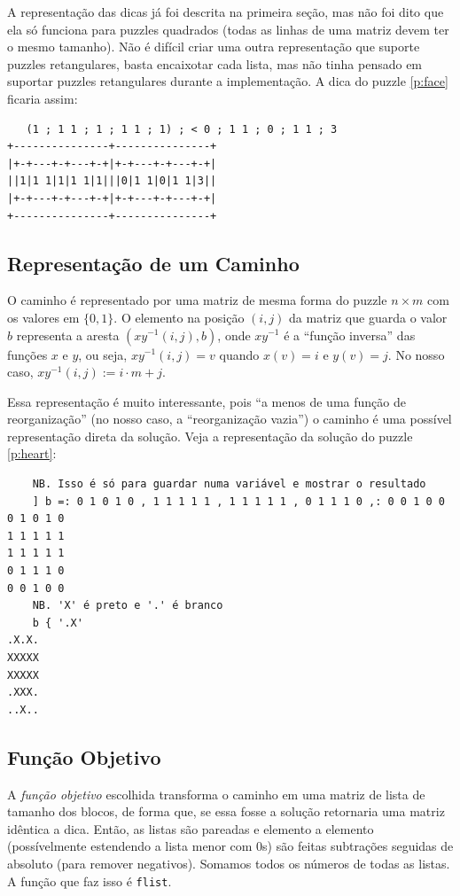 \documentclass{article}
\newcommand{\inlcode}{\texttt}
\begin{document}
A representação das dicas já foi descrita na primeira seção,
mas não foi dito que ela só funciona para puzzles quadrados
(todas as linhas de uma matriz devem ter o mesmo tamanho).
Não é difícil criar uma outra representação que suporte
puzzles retangulares, basta encaixotar cada lista,
mas não tinha pensado em suportar puzzles retangulares durante
a implementação.
A dica do puzzle \ref{p:face} ficaria assim:
\begin{verbatim}
   (1 ; 1 1 ; 1 ; 1 1 ; 1) ; < 0 ; 1 1 ; 0 ; 1 1 ; 3
+---------------+---------------+
|+-+---+-+---+-+|+-+---+-+---+-+|
||1|1 1|1|1 1|1|||0|1 1|0|1 1|3||
|+-+---+-+---+-+|+-+---+-+---+-+|
+---------------+---------------+
\end{verbatim}

\subsection{Representação de um Caminho}
O caminho é representado por uma matriz de mesma forma
do puzzle \(n \times m\) com os valores em \(\{ 0, 1 \}\).
O elemento na posição \((i, j)\) da matriz que guarda o valor \(b\)
representa a aresta \((xy^{-1}(i, j), b)\),
onde \(xy^{-1}\) é a ``função inversa'' das funções \(x\) e \(y\),
ou seja, \(xy^{-1}(i, j) = v\) quando \(x(v) = i\) e \(y(v) = j\).
No nosso caso, \(xy^{-1}(i, j) := i \cdot m + j\).

Essa representação é muito interessante, pois
``a menos de uma função de reorganização''
(no nosso caso, a ``reorganização vazia'')
o caminho é uma possível representação direta da solução.
Veja a representação da solução do puzzle \ref{p:heart}:
\begin{verbatim}
    NB. Isso é só para guardar numa variável e mostrar o resultado
    ] b =: 0 1 0 1 0 , 1 1 1 1 1 , 1 1 1 1 1 , 0 1 1 1 0 ,: 0 0 1 0 0
0 1 0 1 0
1 1 1 1 1
1 1 1 1 1
0 1 1 1 0
0 0 1 0 0
    NB. 'X' é preto e '.' é branco
    b { '.X'
.X.X.
XXXXX
XXXXX
.XXX.
..X..
\end{verbatim}

\subsection{Função Objetivo}
A \emph{função objetivo} escolhida transforma
o caminho em uma matriz de lista de tamanho dos blocos,
de forma que,
se essa fosse a solução retornaria uma matriz idêntica a dica.
Então, as listas são pareadas e elemento a elemento
(possívelmente estendendo a lista menor com \(0\)s)
são feitas subtrações seguidas de absoluto (para remover negativos).
Somamos todos os números de todas as listas.
A função que faz isso é \inlcode{flist}.
\end{document}
